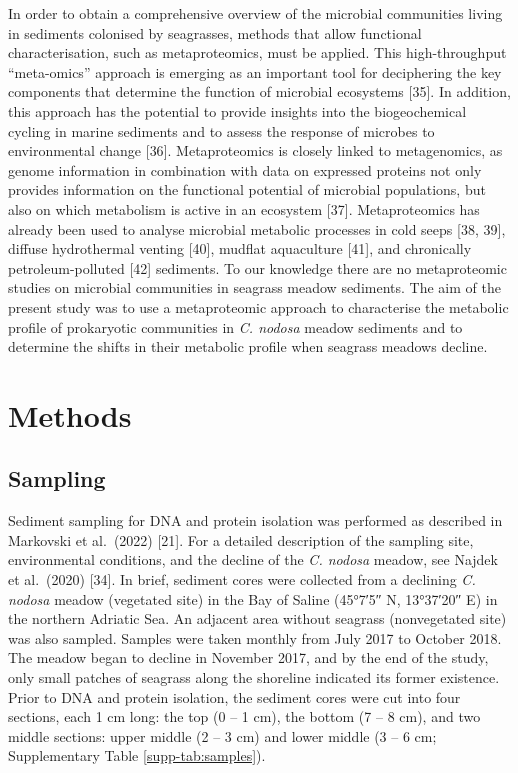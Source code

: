 \documentclass[
  12 pt,
]{article}
\begin{document}
In order to obtain a comprehensive overview of the microbial communities living in sediments colonised by seagrasses, methods that allow functional characterisation, such as metaproteomics, must be applied. This high-throughput ``meta-omics'' approach is emerging as an important tool for deciphering the key components that determine the function of microbial ecosystems {[}35{]}. In addition, this approach has the potential to provide insights into the biogeochemical cycling in marine sediments and to assess the response of microbes to environmental change {[}36{]}. Metaproteomics is closely linked to metagenomics, as genome information in combination with data on expressed proteins not only provides information on the functional potential of microbial populations, but also on which metabolism is active in an ecosystem {[}37{]}. Metaproteomics has already been used to analyse microbial metabolic processes in cold seeps {[}38, 39{]}, diffuse hydrothermal venting {[}40{]}, mudflat aquaculture {[}41{]}, and chronically petroleum-polluted {[}42{]} sediments. To our knowledge there are no metaproteomic studies on microbial communities in seagrass meadow sediments. The aim of the present study was to use a metaproteomic approach to characterise the metabolic profile of prokaryotic communities in \emph{C. nodosa} meadow sediments and to determine the shifts in their metabolic profile when seagrass meadows decline.

\hypertarget{methods}{%
\section{Methods}\label{methods}}

\hypertarget{sampling}{%
\subsection{Sampling}\label{sampling}}

Sediment sampling for DNA and protein isolation was performed as described in Markovski et al.~(2022) {[}21{]}. For a detailed description of the sampling site, environmental conditions, and the decline of the \emph{C. nodosa} meadow, see Najdek et al.~(2020) {[}34{]}. In brief, sediment cores were collected from a declining \emph{C. nodosa} meadow (vegetated site) in the Bay of Saline (\ang{45;7;5} N, \ang{13;37;20} E) in the northern Adriatic Sea. An adjacent area without seagrass (nonvegetated site) was also sampled. Samples were taken monthly from July 2017 to October 2018. The meadow began to decline in November 2017, and by the end of the study, only small patches of seagrass along the shoreline indicated its former existence. Prior to DNA and protein isolation, the sediment cores were cut into four sections, each 1 cm long: the top (0 -- 1 cm), the bottom (7 -- 8 cm), and two middle sections: upper middle (2 -- 3 cm) and lower middle (3 -- 6 cm; Supplementary Table \ref{supp-tab:samples}).
\end{document}
